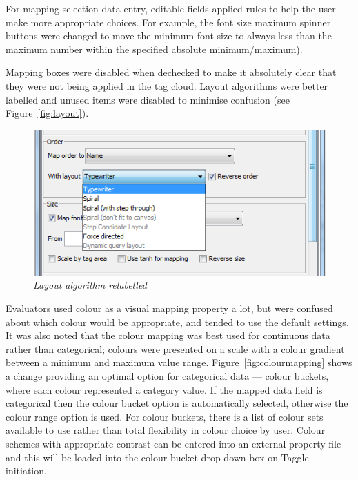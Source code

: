 For mapping selection data entry, editable fields applied rules to help the user make more appropriate choices. For example, the font size maximum spinner buttons were changed to move the minimum font size to always less than the maximum number within the specified absolute minimum/maximum).

Mapping boxes were disabled when dechecked to make it absolutely clear that they were not being applied in the tag cloud. Layout algorithms were better labelled and unused items were disabled to minimise confusion (see Figure~\vref{fig:layout}).

\begin{figure}[!htb]
	\centering
	\includegraphics[scale=1.80]{layout.png}
	\caption{\textit{Layout algorithm relabelled}}
	\label{fig:layout}
\end{figure}

Evaluators used colour as a visual mapping property a lot, but were confused about which colour would be appropriate, and tended to use the default settings. It was also noted that the colour mapping was best used for continuous data rather than categorical; colours were presented on a scale with a colour gradient between a minimum and maximum value range. Figure~\ref{fig:colourmapping} shows a change providing an optimal option for categorical data --- colour buckets, where each colour represented a category value. If the mapped data field is categorical then the colour bucket option is automatically selected, otherwise the colour range option is used. For colour buckets, there is a list of colour sets available to use rather than total flexibility in colour choice by user. Colour schemes with appropriate contrast can be entered into an external property file and this will be loaded into the colour bucket drop-down box on Taggle initiation.

